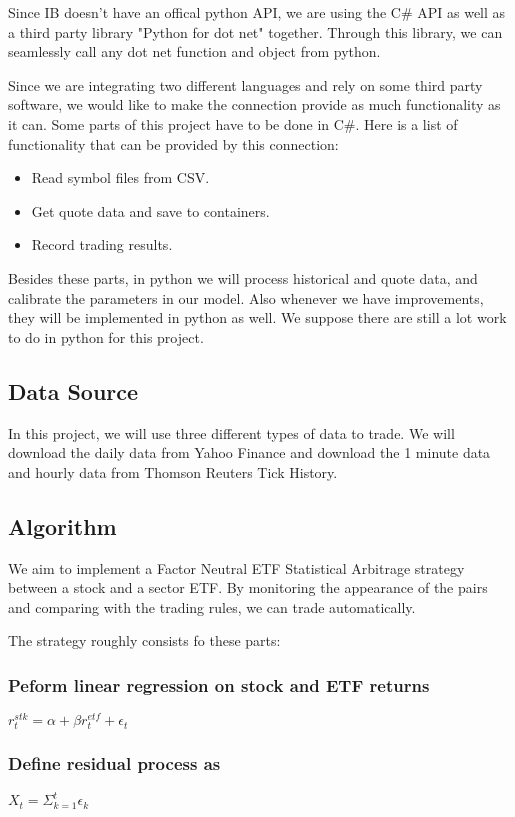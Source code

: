 \documentclass{article}
\begin{document}
Since IB doesn't have an offical python API, we are using the C\# API as well as a third party library "Python for dot net" together. Through this library, we can seamlessly call any dot net function and object from python.

Since we are integrating two different languages and rely on some third party software, we would like to make the connection provide as much functionality as it can. Some parts of this project have to be done in C\#. Here is a list of functionality that can be provided by this connection:
\begin{itemize}
\item Read symbol files from CSV.
\item Get quote data and save to containers.
\item Record trading results.
\end{itemize}

Besides these parts, in python we will process historical and quote data, and calibrate the parameters in our model. Also whenever we have improvements, they will be implemented in python as well. We suppose there are still a lot work to do in python for this project.



\subsection{Data Source}
In this project, we will use three different types of data to trade. We will download the daily data from Yahoo Finance and download the 1 minute data and hourly data from Thomson Reuters Tick History.

\subsection{Algorithm}
We aim to implement a Factor Neutral ETF Statistical Arbitrage strategy between a  stock and a sector ETF. By monitoring the appearance of the pairs and comparing with the trading rules, we can trade automatically.

The strategy roughly consists fo these parts:
\subsubsection*{Peform linear regression on stock and ETF returns}
\begin{center}
$r_t^{stk} = \alpha + \beta r_t^{etf} + \epsilon_t$
\end{center}
\subsubsection*{Define residual process as}
\begin{center}
$X_t = \Sigma_{k=1}^{t}\epsilon_k$
\end{center}
\end{document}
